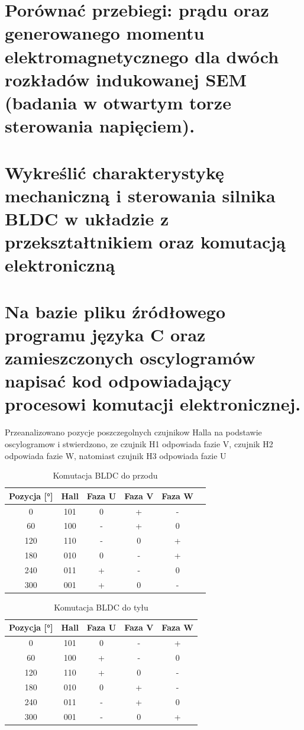\documentclass[11pt]{article}
\begin{document}
\section{Porównać przebiegi: prądu oraz generowanego momentu elektromagnetycznego dla dwóch rozkładów indukowanej SEM (badania w otwartym torze sterowania napięciem).}

\section{Wykreślić charakterystykę mechaniczną i sterowania silnika BLDC w układzie z przekształtnikiem oraz komutacją elektroniczną}

\section{Na bazie pliku źródłowego programu języka C oraz zamieszczonych oscylogramów napisać kod odpowiadający procesowi komutacji elektronicznej.}

Przeanalizowano pozycje poszczegolnych czujnikow Halla na podstawie oscylogramow i stwierdzono, ze czujnik H1 odpowiada fazie V, czujnik H2 odpowiada fazie W, natomiast czujnik H3 odpowiada fazie U\\

\begin{table}[H]
\centering
\begin{tabular}{|c|c|c|c|c|c|}
\hline
Pozycja [°] & Hall & Faza U & Faza V & Faza W \\
\hline
0 & 101 & 0 & + & - \\
\hline
60 & 100 & - & + & 0 \\
\hline
120 & 110 & - & 0 & + \\
\hline
180 & 010 & 0 & - & + \\
\hline
240 & 011 & + & - & 0 \\
\hline
300 & 001 & + & 0  & - \\
\hline
\end{tabular}
\caption{Komutacja BLDC do przodu}
\end{table}

\begin{table}[H]
\centering
\begin{tabular}{|c|c|c|c|c|}
\hline
Pozycja [°] & Hall & Faza U & Faza V & Faza W \\
\hline
0  & 101 & 0 & - & + \\
\hline
60 & 100 & + & - & 0 \\
\hline
120 & 110 & + & 0 & - \\
\hline
180 & 010 & 0 & + & - \\
\hline
240 & 011 & - & + & 0 \\
\hline
300 & 001 & - & 0 & + \\
\hline
\end{tabular}
\caption{Komutacja BLDC do tyłu}
\end{table}
\end{document}
